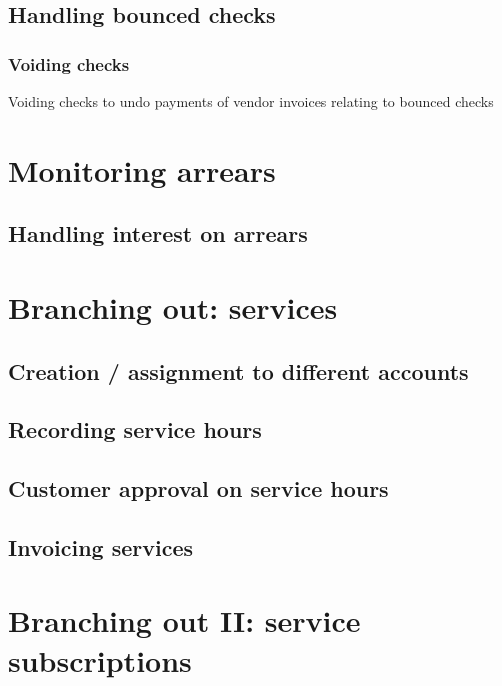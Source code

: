 \section{Handling bounced checks}
\label{sec-vendor-invoice-bounced-checks}

\subsection{Voiding checks}

Voiding checks to undo payments of vendor invoices relating to bounced checks



\chapter{Monitoring arrears}
\label{cha-starting-monitoring-arrears}

\section{Handling interest on arrears}
\label{sec-monitoring-interest-on-arrears}



\chapter{Branching out: services}
\label{cha-starting-branch-to-services}

\section{Creation / assignment to different accounts}
\label{sec-starting-services-assignment}

\section{Recording service hours}
\label{sec-starting-services-writing-hours}

\section{Customer approval on service hours}
\label{sec-starting-services-hours-customer-approval}

\section{Invoicing services}
\label{sec-starting-services-invoicing}

\chapter{Branching out II: service subscriptions}
\label{cha-starting-services-subscriptions}

